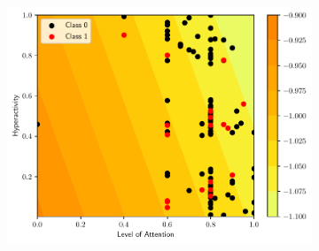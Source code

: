 \begin{figure}
\begin{subfigure}[b]{0.32\textwidth}
    \centering
    \includegraphics[width=\textwidth]{figs/svm-linear-contour-0-5.pdf}
    \caption{}
    \label{fig:SVM-linear1c}
  \end{subfigure}


\end{figure}
